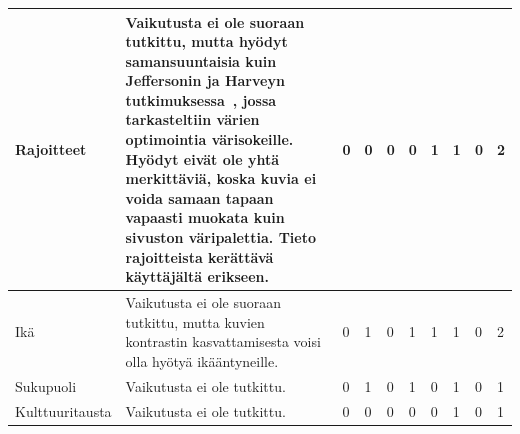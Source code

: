 \documentclass[finnish, 12pt, a4paper, elec, utf8, a-1b, online]{aaltothesis}
\begin{document}
{\begin{longtable}{p{2.5cm}|p{6cm}|p{0.5cm}p{0.5cm}p{0.5cm}|p{0.5cm}|p{0.5cm}p{0.5cm}p{0.5cm}|p{0.5cm}|}
    \midrule
    Rajoitteet                             & Vaikutusta ei ole suoraan tutkittu, mutta hyödyt samansuuntaisia kuin Jeffersonin ja Harveyn tutkimuksessa~\cite{10.1145/1168987.1168996}, jossa tarkasteltiin värien optimointia värisokeille. Hyödyt eivät ole yhtä merkittäviä, koska kuvia ei voida samaan tapaan vapaasti muokata kuin sivuston väripalettia. Tieto rajoitteista kerättävä käyttäjältä erikseen. & 0                                          & 0                                   & 0                                      & 0                            & 1                                               & 1                                         & 0                                         & 2                            \\
    \midrule
    Ikä                                    & Vaikutusta ei ole suoraan tutkittu, mutta kuvien kontrastin kasvattamisesta voisi olla hyötyä ikääntyneille.                                                                                                                                                                                                                                                          & 0                                          & 1                                   & 0                                      & 1                            & 1                                               & 1                                         & 0                                         & 2                            \\
    \midrule
    Sukupuoli                              & Vaikutusta ei ole tutkittu.                                                                                                                                                                                                                                                                                                                                           & 0                                          & 1                                   & 0                                      & 1                            & 0                                               & 1                                         & 0                                         & 1                            \\
    \midrule
    Kulttuuritausta                        & Vaikutusta ei ole tutkittu.                                                                                                                                                                                                                                                                                                                                           & 0                                          & 0                                   & 0                                      & 0                            & 0                                               & 1                                         & 0                                         & 1                            \\

\end{longtable}}
\end{document}
